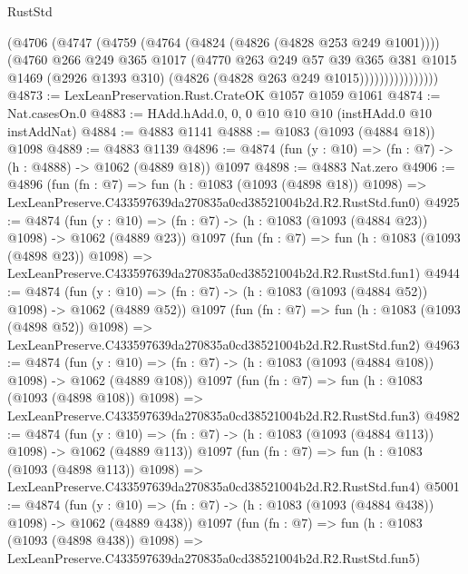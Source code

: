 \begin{lexlean}{RustStd}
\begin{coremodule}
                      (@4706
                        (@4747
                          (@4759
                            (@4764 (@4824 (@4826 (@4828 @253 @249 @1001))))
                            (@4760
                              @266
                              @249
                              @365
                              @1017
                              (@4770
                                @263
                                @249
                                @57
                                @39
                                @365
                                @381
                                @1015
                                @1469
                                (@2926 @1393 @310)
                                (@4826 (@4828 @263 @249 @1015))))))))))))))))
@4873 := LexLeanPreservation.Rust.CrateOK @1057 @1059 @1061
@4874 := Nat.casesOn.{0}
@4883 := HAdd.hAdd.{0, 0, 0} @10 @10 @10 (instHAdd.{0} @10 instAddNat)
@4884 := @4883 @1141
@4888 := @1083 (@1093 (@4884 @18)) @1098
@4889 := @4883 @1139
@4896 := @4874 (fun (y : @10) => (fn : @7) -> (h : @4888) -> @1062 (@4889 @18)) @1097
@4898 := @4883 Nat.zero
@4906 := @4896
    (fun (fn : @7) =>
    fun (h : @1083 (@1093 (@4898 @18)) @1098) =>
    LexLeanPreserve.C433597639da270835a0cd38521004b2d.R2.RustStd.fun0)
@4925 := @4874
    (fun (y : @10) => (fn : @7) -> (h : @1083 (@1093 (@4884 @23)) @1098) -> @1062 (@4889 @23))
    @1097
    (fun (fn : @7) =>
    fun (h : @1083 (@1093 (@4898 @23)) @1098) =>
    LexLeanPreserve.C433597639da270835a0cd38521004b2d.R2.RustStd.fun1)
@4944 := @4874
    (fun (y : @10) => (fn : @7) -> (h : @1083 (@1093 (@4884 @52)) @1098) -> @1062 (@4889 @52))
    @1097
    (fun (fn : @7) =>
    fun (h : @1083 (@1093 (@4898 @52)) @1098) =>
    LexLeanPreserve.C433597639da270835a0cd38521004b2d.R2.RustStd.fun2)
@4963 := @4874
    (fun (y : @10) => (fn : @7) -> (h : @1083 (@1093 (@4884 @108)) @1098) -> @1062 (@4889 @108))
    @1097
    (fun (fn : @7) =>
    fun (h : @1083 (@1093 (@4898 @108)) @1098) =>
    LexLeanPreserve.C433597639da270835a0cd38521004b2d.R2.RustStd.fun3)
@4982 := @4874
    (fun (y : @10) => (fn : @7) -> (h : @1083 (@1093 (@4884 @113)) @1098) -> @1062 (@4889 @113))
    @1097
    (fun (fn : @7) =>
    fun (h : @1083 (@1093 (@4898 @113)) @1098) =>
    LexLeanPreserve.C433597639da270835a0cd38521004b2d.R2.RustStd.fun4)
@5001 := @4874
    (fun (y : @10) => (fn : @7) -> (h : @1083 (@1093 (@4884 @438)) @1098) -> @1062 (@4889 @438))
    @1097
    (fun (fn : @7) =>
    fun (h : @1083 (@1093 (@4898 @438)) @1098) =>
    LexLeanPreserve.C433597639da270835a0cd38521004b2d.R2.RustStd.fun5)

\end{coremodule}
\end{lexlean}
